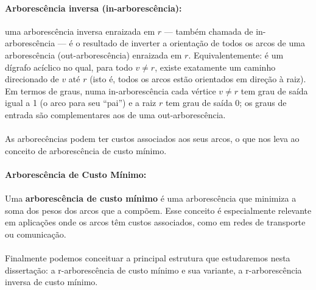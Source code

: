 \documentclass[12pt,a4paper]{article}
\def\emph#1{#1}%
\begin{document}
\paragraph{Arborescência inversa (in-arborescência):}
uma \emph{arborescência inversa} enraizada em \(r\) — também chamada de \emph{in-arborescência} — é o resultado de inverter a orientação de todos os arcos de uma arborescência (out-arborescência) enraizada em \(r\). Equivalentemente: é um dígrafo acíclico no qual, para todo \(v\neq r\), existe \emph{exatamente um} caminho direcionado de \(v\) até \(r\) (isto é, todos os arcos estão orientados \emph{em direção} à raiz). Em termos de graus, numa in-arborescência cada vértice \(v\neq r\) tem grau de saída igual a 1 (o arco para seu “pai”) e a raiz \(r\) tem grau de saída 0; os graus de entrada são complementares aos de uma out-arborescência.

\paragraph{}
As arborecências podem ter custos associados aos seus arcos, o que nos leva ao conceito de arborescência de custo mínimo.

\paragraph{Arborescência de Custo Mínimo:}
\paragraph{}
Uma \textbf{arborescência de custo mínimo} é uma arborescência que minimiza a soma dos pesos dos arcos que a compõem. Esse conceito é especialmente relevante em aplicações onde os arcos têm custos associados, como em redes de transporte ou comunicação.

\paragraph{}
Finalmente podemos conceituar a principal estrutura que estudaremos nesta dissertação: a r-arborescência de custo mínimo e sua variante, a r-arborescência inversa de custo mínimo.
\end{document}
